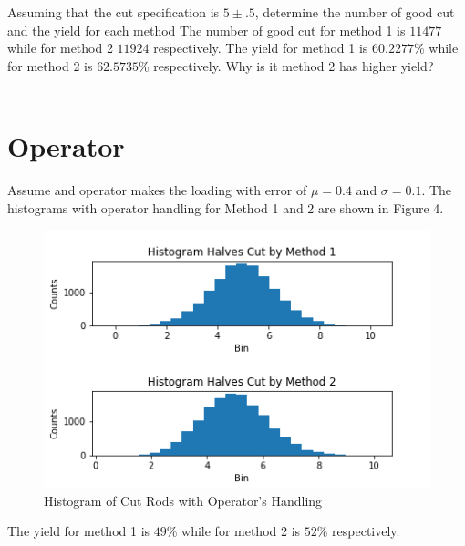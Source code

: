 \documentclass[10pt,a4paper]{article}
\begin{document}
\noindent Assuming that the cut specification is $5 \pm .5$, determine the number    of good cut and the yield for each method
\noindent The number of good cut for method 1 is $11477 $ while for method 2 $11924 $ respectively.  
\noindent The yield for method 1 is $60.2277 $\% while for method 2 is $62.5735 $\% respectively. Why is it method 2 has higher yield? \\ \\    \section{Operator}    Assume and operator makes the loading with error of $\mu = 0.4 $ and $\sigma = 0.1 $. 
\noindent The histograms with operator handling for Method 1 and 2 are shown in     Figure 4.
\begin{figure}[H]
\centering\includegraphics[width=1\linewidth,height=0.5\textheight]{Fig04}
\caption{Histogram of Cut Rods with    Operator's Handling}
\label{fig:Fig04}
\end{figure}

\noindent The yield for method 1 is $49 $\% while for method 2 is $52 $\% respectively.
\end{document}
